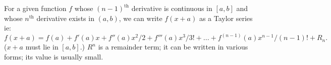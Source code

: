 For a given function $f$ whose $(n-1)^{\mbox{th}}$ derivative is
continuous in $[a,b]$ and whose $n^{\mbox{th}}$ derivative exists in
$(a,b)$, we can write $f(x+a)$ as a Taylor series ie:
$$
f(x+a)=f(a)+f'(a)x+f''(a)x^{2}/2+f'''(a)x^{3}/3!+... +f^{(n-1)}(a)x^{n-1}/(n-1)!+R_{n}.
$$
($x+a$ must lie in $[a,b]$.)
$R^{n}$  is a remainder term; it can be written in various forms;
its value is usually small.